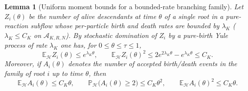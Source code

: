 \documentclass[a4paper,fleqn]{cas-sc}
\newtheorem{lemma}[theorem]{Lemma}
\theoremstyle{definition}
\theoremstyle{remark}
\begin{document}
\begin{lemma}[Uniform moment bounds for a bounded-rate branching family]\label{lem:branch-moments}
Let $Z_i(\theta)$ be the number of alive descendants at time $\theta$ of a single
root in a pure-reaction subflow whose per-particle birth and death rates are bounded
by $\lambda_K$ ($\lambda_K\le C_K$ on $\mathcal A_{K,R,N}$). By stochastic domination of $Z_i$ by a
pure-birth Yule process of rate $\lambda_K$ one has, for $0\le\theta\le\tau\le1$,
\begin{equation}\label{eq:Zmoments}
\mathbb E_{\mathcal H}Z_i(\theta)\le e^{\lambda_K\theta},
\qquad
\mathbb E_{\mathcal H}Z_i(\theta)^2\le 2e^{2\lambda_K\theta}-e^{\lambda_K\theta}\le C_K .
\end{equation}
Moreover, if $A_i(\theta)$ denotes the number of accepted birth/death events in the
family of root $i$ up to time $\theta$, then
\begin{equation}\label{eq:Amoments}
\mathbb E_{\mathcal H}A_i(\theta)\le C_K\theta,
\qquad
\mathbb P_{\mathcal H}\bigl(A_i(\theta)\ge2\bigr)\le C_K\theta^2,
\qquad
\mathbb E_{\mathcal H}A_i(\theta)^2\le C_K\theta .
\end{equation}
\end{lemma}
\end{document}
